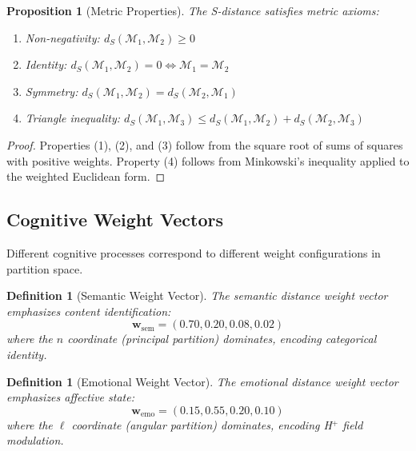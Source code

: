 \documentclass[aps,prd,twocolumn,superscriptaddress,floatfix,nofootinbib]{revtex4-2}
\newtheorem{definition}[theorem]{Definition}
\newtheorem{proposition}[theorem]{Proposition}
\theoremstyle{remark}
\newcommand{\Mstate}{\mathcal{M}}
\newcommand{\dS}{d_S}
\newcommand{\wvec}{\mathbf{w}}
\begin{document}
\begin{proposition}[Metric Properties]
\label{prop:sdist_metric}
The S-distance satisfies metric axioms:
\begin{enumerate}
\item Non-negativity: $\dS(\Mstate_1, \Mstate_2) \geq 0$
\item Identity: $\dS(\Mstate_1, \Mstate_2) = 0 \iff \Mstate_1 = \Mstate_2$
\item Symmetry: $\dS(\Mstate_1, \Mstate_2) = \dS(\Mstate_2, \Mstate_1)$
\item Triangle inequality: $\dS(\Mstate_1, \Mstate_3) \leq \dS(\Mstate_1, \Mstate_2) + \dS(\Mstate_2, \Mstate_3)$
\end{enumerate}
\end{proposition}

\begin{proof}
Properties (1), (2), and (3) follow from the square root of sums of squares with positive weights. Property (4) follows from Minkowski's inequality applied to the weighted Euclidean form.
\end{proof}

\subsection{Cognitive Weight Vectors}

Different cognitive processes correspond to different weight configurations in partition space.

\begin{definition}[Semantic Weight Vector]
\label{def:semantic_weight}
The semantic distance weight vector emphasizes content identification:
\begin{equation}
\wvec_{\text{sem}} = (0.70, 0.20, 0.08, 0.02)
\end{equation}
where the $n$ coordinate (principal partition) dominates, encoding categorical identity.
\end{definition}

\begin{definition}[Emotional Weight Vector]
\label{def:emotional_weight}
The emotional distance weight vector emphasizes affective state:
\begin{equation}
\wvec_{\text{emo}} = (0.15, 0.55, 0.20, 0.10)
\end{equation}
where the $\ell$ coordinate (angular partition) dominates, encoding H$^+$ field modulation.
\end{definition}
\end{document}
